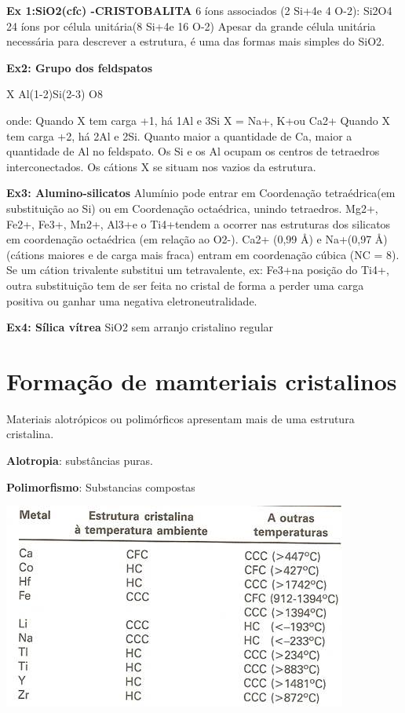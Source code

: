 \textbf{Ex 1:SiO2(cfc) -CRISTOBALITA}
6 íons associados (2 Si+4e 4 O-2): Si2O4
24 íons por célula unitária(8 Si+4e 16 O-2)
Apesar da grande célula unitária necessária para descrever a estrutura, é uma das formas mais simples do SiO2.


\textbf{Ex2: Grupo dos feldspatos}

X Al(1-2)Si(2-3) O8


onde: Quando X tem carga +1, há 1Al e 3Si X = Na+, K+ou Ca2+ Quando X tem carga +2, há 2Al e 2Si. Quanto maior a quantidade de Ca, maior a quantidade de Al no feldspato. Os Si e os Al ocupam os centros de tetraedros interconectados. Os cátions X se situam nos vazios da estrutura.



\textbf{Ex3: Alumino-silicatos}
Alumínio pode entrar em Coordenação tetraédrica(em substituição ao Si) ou em Coordenação octaédrica, unindo tetraedros.
Mg2+, Fe2+, Fe3+, Mn2+, Al3+e o Ti4+tendem a ocorrer nas estruturas dos silicatos em coordenação octaédrica (em relação ao O2-).
Ca2+ (0,99 Å) e Na+(0,97 Å) (cátions maiores e de carga mais fraca) entram em coordenação cúbica (NC = 8).
Se um cátion trivalente substitui um tetravalente, ex: Fe3+na posição do Ti4+, outra substituição tem de ser feita no cristal de forma a perder uma carga positiva ou ganhar uma negativa eletroneutralidade.


\textbf{Ex4: Sílica vítrea}
SiO2 sem arranjo cristalino regular



\section{Formação de mamteriais cristalinos}
Materiais alotrópicos ou polimórficos apresentam mais de uma estrutura cristalina.

\textbf{Alotropia}: substâncias puras.

\textbf{Polimorfismo}: Substancias compostas

\includegraphics[scale=0.4,trim={0 0 0 0}]{figures/estruturaTemp}

